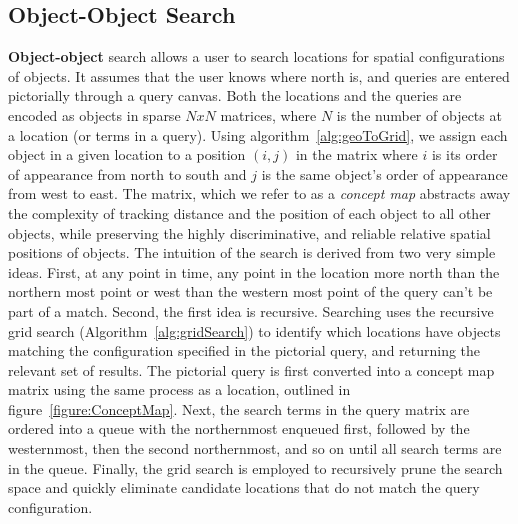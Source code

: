 \subsection{Object-Object Search}
\textbf{Object-object} search allows a user to search locations for spatial configurations of objects. 
It assumes that the user knows where north is, and queries are entered pictorially through a query canvas. 
Both the locations and the queries are encoded as objects in sparse $NxN$ matrices, where $N$ is the number of objects at a location (or terms in a query). 
Using algorithm~\ref{alg:geoToGrid}, we assign each object in a given location to a position $(i,j)$ in the matrix where $i$ is its order of appearance from north to south and $j$ is the same object's order of appearance from west to east.
The matrix, which we refer to as a \textit{concept map} abstracts away the complexity of tracking distance and the position of each object to all other objects, while preserving the highly discriminative, and reliable relative spatial positions of objects. 
The intuition of the search is derived from two very simple ideas. First, at any point in time, any point in the location more north than the northern most point or west than the western most point of the query can't be part of a match.
Second, the first idea is recursive.
Searching uses the recursive grid search (Algorithm~\ref{alg:gridSearch}) to identify which locations have objects matching the configuration specified in the pictorial query, and returning the relevant set of results. 
The pictorial query is first converted into a concept map matrix using the same process as a location, outlined in figure~\ref{figure:ConceptMap}.
Next, the search terms in the query matrix are ordered into a queue with the northernmost enqueued first, followed by the westernmost, then the second northernmost, and so on until all search terms are in the queue.
Finally, the grid search is employed to recursively prune the search space and quickly eliminate candidate locations that do not match the query configuration.

